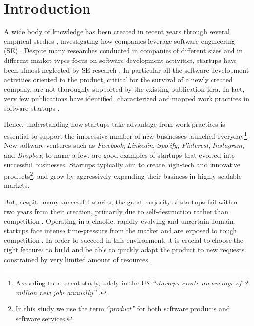 \documentclass[final,5p,times,twocolumn]{elsarticle}
\begin{document}



\small
\section{Introduction}  %
 \label{sect:intro} 
A wide body of knowledge has been created in recent years through several empirical studies , investigating how companies leverage software engineering (SE) \cite{Kitchenham2009}. Despite many researches conducted in companies of different sizes and in different market types focus on software development activities, startups have been almost neglected by SE research \cite{Sutton2000}. In particular all the software development activities oriented to the product, critical for the survival of a newly created company, are not thoroughly supported by the existing publication fora. In fact, very few publications have identified, characterized and mapped work practices in software startups \cite{Sutton2000}.

Hence, understanding how startups take advantage from work practices is essential to support the impressive number of new businesses launched everyday\footnote{According to a recent study, solely in the US \textit{``startups create an average of 3 million new jobs annually''} \cite{Formation2010}.}. New software ventures such as \textit{Facebook}, \textit{Linkedin}, \textit{Spotify}, \textit{Pinterest}, \textit{Instagram}, and \textit{Dropbox}, to name a few, are good examples of startups that evolved into successful businesses. Startups typically aim to create high-tech and innovative products\footnote{In this study we use the term \textit{``product''} for both software products and software services.}, and grow by aggressively expanding their business in highly scalable markets.

But, despite many successful stories, the great majority of startups fail within two years from their creation, primarily due to self-destruction rather than competition \cite{Crowne2002}. Operating in a chaotic, rapidly evolving and uncertain domain, startups face intense time-pressure from the market and are exposed to tough competition \cite{Maccormack2001, Eisenhardt1998}. In order to succeed in this environment, it is crucial to choose the right features to build  and be able to quickly adapt the product to new requests constrained by very limited amount of resources \cite{Sutton2000}.
\end{document}
